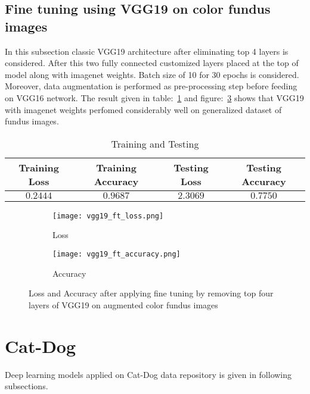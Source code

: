 \documentclass[12pt,a4paper,titlepage]{report}
\begin{document}
\subsection{Fine tuning using VGG19 on color fundus images}
In this subsection classic VGG19 architecture after eliminating top 4 layers is considered. After this two fully connected customized layers placed at the top of model along with imagenet weights. Batch size of 10 for 30 epochs is considered. Moreover, data augmentation is performed as pre-processing step before feeding on VGG16 network. The result given in table:~\ref{tab: Table-13} and figure:~\ref{fig: Image7} shows that VGG19 with imagenet weights perfomed considerably well on generalized dataset of fundus images.
\vspace{20pt}
\begin{table}[H]
\centering
\caption{Training and Testing}
\label{tab: Table-13}
\begin{tabular}{c c c c}
\hline
\textbf{Training Loss} & \textbf{Training Accuracy} & \textbf{Testing Loss} & \textbf{Testing Accuracy}\\
\hline
$0.2444$ & $0.9687$ & $2.3069$ & $0.7750$\\
\hline
\end{tabular}
\end{table}

\begin{figure}[H]
\centering
\begin{subfigure}[h]{0.45\linewidth}
\texttt{[image: vgg19\_ft\_loss.png]}
\caption{Loss}
\label{fig:a}
\end{subfigure}
\quad
\begin{subfigure}[h]{0.45\linewidth}
\texttt{[image: vgg19\_ft\_accuracy.png]}
\caption{Accuracy}
\label{fig:b}
\end{subfigure}
\caption{Loss and Accuracy after applying fine tuning by removing top four layers of VGG19 on augmented color fundus images}
\label{fig: Image7}
\end{figure}

\section{Cat-Dog}
Deep learning models applied on Cat-Dog data repository is given in following subsections.
\end{document}
